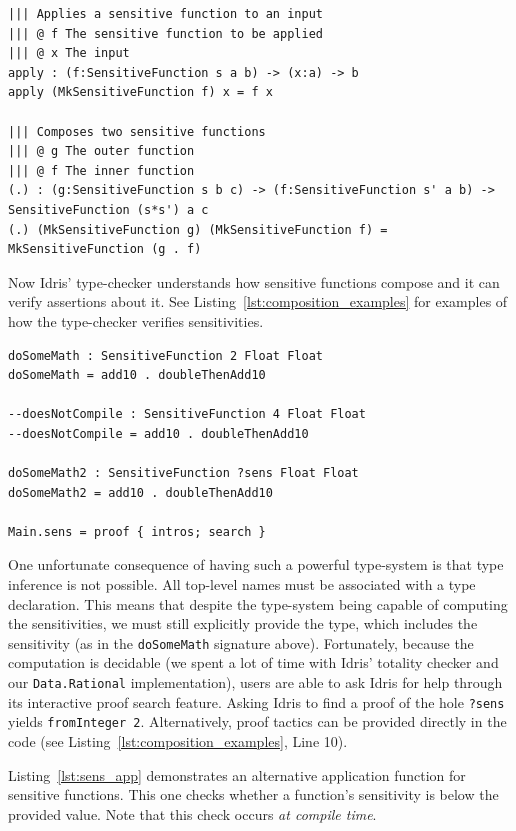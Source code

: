 \documentclass[12pt]{report}
\begin{document}
\begin{lstlisting}[caption={Sensitive function operations},label={lst:sens_fns_ops}]
||| Applies a sensitive function to an input
||| @ f The sensitive function to be applied
||| @ x The input
apply : (f:SensitiveFunction s a b) -> (x:a) -> b
apply (MkSensitiveFunction f) x = f x

||| Composes two sensitive functions
||| @ g The outer function
||| @ f The inner function
(.) : (g:SensitiveFunction s b c) -> (f:SensitiveFunction s' a b) -> SensitiveFunction (s*s') a c
(.) (MkSensitiveFunction g) (MkSensitiveFunction f) = MkSensitiveFunction (g . f)
\end{lstlisting}

Now Idris' type-checker understands how sensitive functions compose and it can verify assertions about it.
See Listing~\ref{lst:composition_examples} for examples of how the type-checker verifies sensitivities.

\begin{lstlisting}[caption={Examples of Sensitive Function Composition},label={lst:composition_examples}]
doSomeMath : SensitiveFunction 2 Float Float
doSomeMath = add10 . doubleThenAdd10

--doesNotCompile : SensitiveFunction 4 Float Float
--doesNotCompile = add10 . doubleThenAdd10

doSomeMath2 : SensitiveFunction ?sens Float Float
doSomeMath2 = add10 . doubleThenAdd10

Main.sens = proof { intros; search }
\end{lstlisting}

One unfortunate consequence of having such a powerful type-system is that type inference is not possible.
All top-level names must be associated with a type declaration.
This means that despite the type-system being capable of computing the sensitivities, we must still explicitly provide the type, which includes the sensitivity (as in the \texttt{doSomeMath} signature above).
Fortunately, because the computation is decidable (we spent a lot of time with Idris' totality checker and our \texttt{Data.Rational} implementation), users are able to ask Idris for help through its interactive proof search feature.
Asking Idris to find a proof of the hole \texttt{?sens} yields \texttt{fromInteger 2}.
Alternatively, proof tactics can be provided directly in the code (see Listing~\ref{lst:composition_examples}, Line 10).

Listing~\ref{lst:sens_app} demonstrates an alternative application function for sensitive functions.
This one checks whether a function's sensitivity is below the provided value.
Note that this check occurs \textit{at compile time}.
\end{document}
